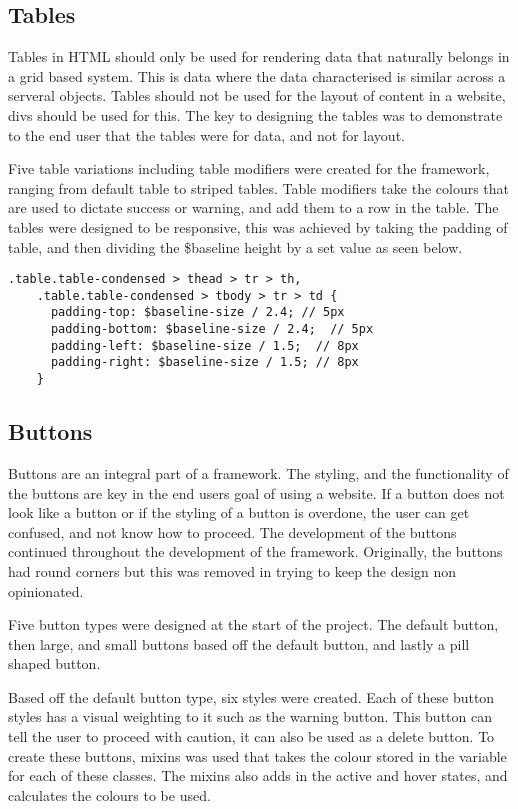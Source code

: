 \newpage
\subsection*{Tables}
Tables in HTML should only be used for rendering data that naturally belongs in a grid based system. This is data where the data characterised is similar across a serveral objects. Tables should not be used for the layout of content in a website, divs should be used for this. The key to designing the tables was to demonstrate to the end user that the tables were for data, and not for layout.

Five table variations including table modifiers were created for the framework, ranging from default table to striped tables. Table modifiers take the colours that are used to dictate success or warning, and add them to a row in the table. The tables were designed to be responsive, this was achieved by taking the padding of table, and then dividing the \$baseline height by a set value as seen below. 

\begin{lstlisting}[language=CSS3]
    .table.table-condensed > thead > tr > th,
    .table.table-condensed > tbody > tr > td {
      padding-top: $baseline-size / 2.4; // 5px
      padding-bottom: $baseline-size / 2.4;  // 5px
      padding-left: $baseline-size / 1.5;  // 8px
      padding-right: $baseline-size / 1.5; // 8px
    }
\end{lstlisting}


\subsection*{Buttons}
Buttons are an integral part of a framework. The styling, and the functionality of the buttons are key in the end users goal of using a website. If a button does not look like a button or if the styling of a button is overdone, the user can get confused, and not know how to proceed. The development of the buttons continued throughout the development of the framework. Originally, the buttons had round corners but this was removed in trying to keep the design non opinionated. 

Five button types were designed at the start of the project. The default button, then large, and small buttons based off the default button, and lastly a pill shaped button. 

Based off the default button type, six styles were created. Each of these button styles has a visual weighting to it such as the warning button. This button can tell the user to proceed with caution, it can also be used as a delete button. To create these buttons, \gls{mixins} was used that takes the colour stored in the variable for each of these classes. The \gls{mixins} also adds in the active and hover states, and calculates the colours to be used. 

